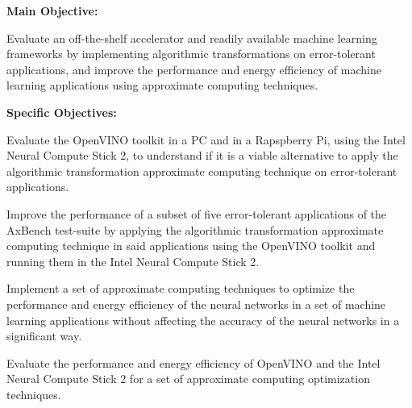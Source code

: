 \textbf{Main Objective:}

Evaluate an off-the-shelf accelerator and readily available machine learning frameworks by implementing algorithmic transformations on error-tolerant applications, and improve the performance and energy efficiency of machine learning applications using approximate computing techniques.

\textbf{Specific Objectives:}

\begin{compactitem}
    \item Evaluate the OpenVINO toolkit in a PC and in a Rapspberry Pi, using the Intel Neural Compute Stick 2, to understand if it is a viable alternative to apply the algorithmic transformation approximate computing technique on error-tolerant applications.
	\item Improve the performance of a subset of five error-tolerant applications of the AxBench test-suite by applying the algorithmic transformation approximate computing technique in said applications using the OpenVINO toolkit and running them in the Intel Neural Compute Stick 2.
	\item Implement a set of approximate computing techniques to optimize the performance and energy efficiency of the neural networks in a set of machine learning applications without affecting the accuracy of the neural networks in a significant way.
	\item Evaluate the performance and energy efficiency of OpenVINO and the Intel Neural Compute Stick 2 for a set of approximate computing optimization techniques.
\end{compactitem}

